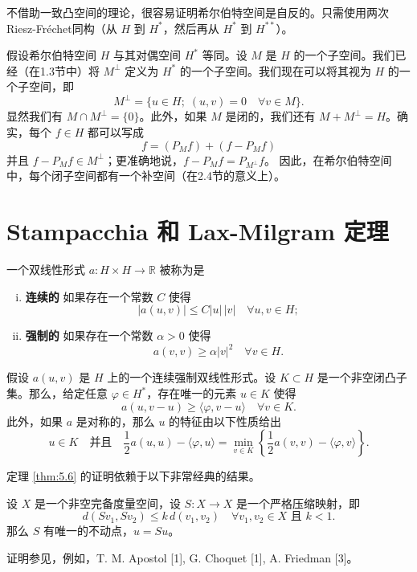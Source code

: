 \begin{remark}
不借助一致凸空间的理论，很容易证明希尔伯特空间是自反的。只需使用两次Riesz-Fréchet同构（从 $H$ 到 $H^*$，然后再从 $H^*$ 到 $H^{**}$）。
\end{remark}

\begin{remark}
假设希尔伯特空间 $H$ 与其对偶空间 $H^*$ 等同。设 $M$ 是 $H$ 的一个子空间。我们已经（在1.3节中）将 $M^\perp$ 定义为 $H^*$ 的一个子空间。我们现在可以将其视为 $H$ 的一个子空间，即
\[ M^\perp = \{ u \in H; \; (u,v)=0 \quad \forall v \in M \}. \]
显然我们有 $M \cap M^\perp = \{0\}$。此外，如果 $M$ 是闭的，我们还有 $M+M^\perp = H$。确实，每个 $f \in H$ 都可以写成
\[ f = (P_M f) + (f - P_M f) \]
并且 $f-P_M f \in M^\perp$；更准确地说，$f-P_M f = P_{M^\perp} f$。
因此，在希尔伯特空间中，每个闭子空间都有一个补空间（在2.4节的意义上）。
\end{remark}

\section{Stampacchia 和 Lax-Milgram 定理}
\label{sec:5.3}

\begin{definition}
一个双线性形式 $a: H \times H \to \mathbb{R}$ 被称为是
\begin{enumerate}[(i)]
    \item \textbf{连续的} 如果存在一个常数 $C$ 使得
    \[ |a(u,v)| \le C|u|\,|v| \quad \forall u,v \in H; \]
    \item \textbf{强制的} 如果存在一个常数 $\alpha > 0$ 使得
    \[ a(v,v) \ge \alpha |v|^2 \quad \forall v \in H. \]
\end{enumerate}
\end{definition}

\begin{theorem}[Stampacchia]\label{thm:5.6}
假设 $a(u,v)$ 是 $H$ 上的一个连续强制双线性形式。设 $K \subset H$ 是一个非空闭凸子集。那么，给定任意 $\varphi \in H^*$，存在唯一的元素 $u \in K$ 使得
\begin{equation}\label{eq:5.10}
a(u,v-u) \ge \langle \varphi, v-u \rangle \quad \forall v \in K.
\end{equation}
此外，如果 $a$ 是对称的，那么 $u$ 的特征由以下性质给出
\begin{equation}\label{eq:5.11}
u \in K \quad \text{并且} \quad \frac{1}{2}a(u,u) - \langle \varphi, u \rangle = \min_{v \in K} \left\{ \frac{1}{2}a(v,v) - \langle \varphi, v \rangle \right\}.
\end{equation}
\end{theorem}
定理 \ref{thm:5.6} 的证明依赖于以下非常经典的结果。
\begin{theorem}\label{thm:5.7}
设 $X$ 是一个非空完备度量空间，设 $S: X \to X$ 是一个严格压缩映射，即
\[ d(Sv_1, Sv_2) \le k \, d(v_1, v_2) \quad \forall v_1, v_2 \in X \text{ 且 } k < 1. \]
那么 $S$ 有唯一的不动点，$u=Su$。
\end{theorem}
证明参见，例如，T. M. Apostol [1], G. Choquet [1], A. Friedman [3]。

